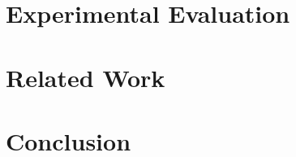 \documentclass[conference, 10pt]{IEEEtran}
\begin{document}
\section{Experimental Evaluation}

\section{Related Work}



\cite{ref:ocelot-pact}

% 


\section{Conclusion}



\end{document}
